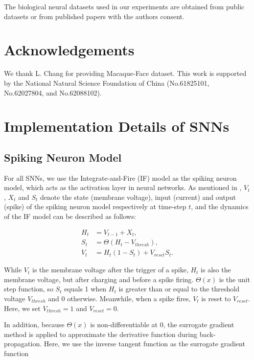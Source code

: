 \documentclass[letterpaper]{article} %
\begin{document}
The biological neural datasets used in our experiments are obtained from public datasets or from published papers with the authors consent.

\section{Acknowledgements}

We thank L. Chang for providing Macaque-Face dataset. This work is supported by the National Natural Science Foundation of China (No.61825101, No.62027804, and No.62088102).



\clearpage

\appendix

\setcounter{secnumdepth}{1}

\section{Implementation Details of SNNs}
\label{appendix.snn_train}

\subsection{Spiking Neuron Model}

For all SNNs, we use the Integrate-and-Fire (IF) model as the spiking neuron model, which acts as the activation layer in neural networks. As mentioned in \cite{fang2021incorporating, fang2021deep}, $V_t$, $X_t$ and $S_t$ denote the state (membrane voltage), input (current) and output (spike) of the spiking neuron model respectively at time-step $t$, and the dynamics of the IF model can be described as follows:

\begin{align}
	H_t &= V_{t - 1} + X_t, \\
	S_t &= \Theta(H_t - V_{thresh}), \\
	V_t &= H_t (1 - S_t) + V_{reset} S_t.
\end{align}

While $V_t$ is the membrane voltage after the trigger of a spike, $H_t$ is also the membrane voltage, but after charging and before a spike firing. $\Theta(x)$ is the unit step function, so $S_t$ equals 1 when $H_t$ is greater than or equal to the threshold voltage $V_{thresh}$ and 0 otherwise. Meanwhile, when a spike fires, $V_t$ is reset to $V_{reset}$. Here, we set $V_{thresh} = 1$ and $V_{reset} = 0$.

In addition, because $\Theta(x)$ is non-differentiable at 0, the surrogate gradient method \cite{neftci2019surrogate} is applied to approximate the derivative function during back-propagation. Here, we use the inverse tangent function as the surrogate gradient function 
\end{document}

